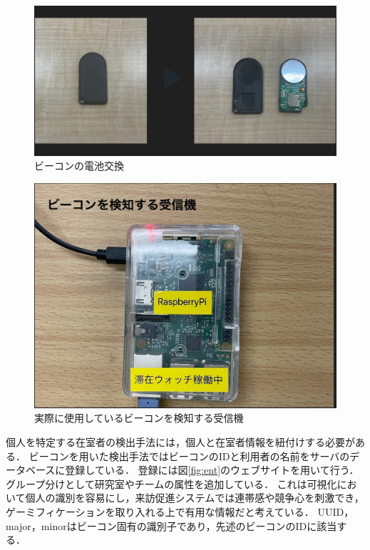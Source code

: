\begin{figure}[H]
  \begin{center}
    \includegraphics[width=150mm]{image/batchange.png}
    \caption{ビーコンの電池交換}
    \label{fig:batchange}
  \end{center}
\end{figure}

\begin{figure}[H]
  \begin{center}
    \includegraphics[width=150mm]{image/RasPi.jpg}
    \caption{実際に使用しているビーコンを検知する受信機}
    \label{fig:raspi}
  \end{center}
\end{figure}

個人を特定する在室者の検出手法には，個人と在室者情報を紐付けする必要がある．
ビーコンを用いた検出手法ではビーコンのIDと利用者の名前をサーバのデータベースに登録している．
登録には図\ref{fig:ent}のウェブサイトを用いて行う．
グループ分けとして研究室やチームの属性を追加している．
これは可視化において個人の識別を容易にし，来訪促進システムでは連帯感や競争心を刺激でき，ゲーミフィケーション\cite{gamification}を取り入れる上で有用な情報だと考えている．
UUID，major，minorはビーコン固有の識別子であり，先述のビーコンのIDに該当する．

